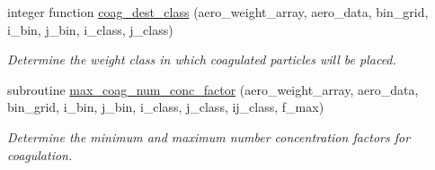 \begin{DoxyCompactItemize}
integer function \mbox{\hyperlink{namespacepmc__coag__kernel_a472f1cb2e3d50f1d44c1cb3a55df568b}{coag\+\_\+dest\+\_\+class}} (aero\+\_\+weight\+\_\+array, aero\+\_\+data, bin\+\_\+grid, i\+\_\+bin, j\+\_\+bin, i\+\_\+class, j\+\_\+class)
\begin{DoxyCompactList}\small\item\em Determine the weight class in which coagulated particles will be placed. \end{DoxyCompactList}\item 
subroutine \mbox{\hyperlink{namespacepmc__coag__kernel_aff06e0cba11c675531b31fee88244d74}{max\+\_\+coag\+\_\+num\+\_\+conc\+\_\+factor}} (aero\+\_\+weight\+\_\+array, aero\+\_\+data, bin\+\_\+grid, i\+\_\+bin, j\+\_\+bin, i\+\_\+class, j\+\_\+class, ij\+\_\+class, f\+\_\+max)
\begin{DoxyCompactList}\small\item\em Determine the minimum and maximum number concentration factors for coagulation. \end{DoxyCompactList}\end{DoxyCompactItemize}
